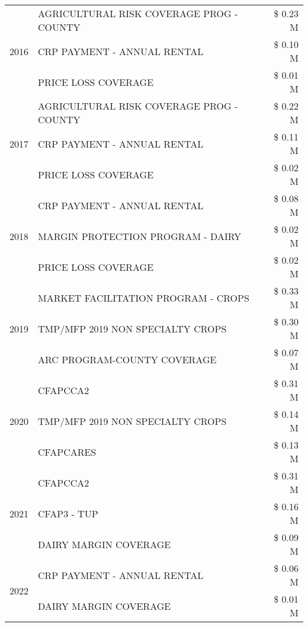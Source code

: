 \begin{tabular}{llr}
\cline{1-3}
\multirow[t]{3}{*}{2016} & AGRICULTURAL RISK COVERAGE PROG - COUNTY & \$ 0.23 M \\
 & CRP PAYMENT - ANNUAL RENTAL & \$ 0.10 M \\
 & PRICE LOSS COVERAGE & \$ 0.01 M \\
\cline{1-3}
\multirow[t]{3}{*}{2017} & AGRICULTURAL RISK COVERAGE PROG - COUNTY & \$ 0.22 M \\
 & CRP PAYMENT - ANNUAL RENTAL & \$ 0.11 M \\
 & PRICE LOSS COVERAGE & \$ 0.02 M \\
\cline{1-3}
\multirow[t]{3}{*}{2018} & CRP PAYMENT - ANNUAL RENTAL & \$ 0.08 M \\
 & MARGIN PROTECTION PROGRAM - DAIRY & \$ 0.02 M \\
 & PRICE LOSS COVERAGE & \$ 0.02 M \\
\cline{1-3}
\multirow[t]{3}{*}{2019} & MARKET FACILITATION PROGRAM - CROPS & \$ 0.33 M \\
 & TMP/MFP 2019 NON SPECIALTY CROPS & \$ 0.30 M \\
 & ARC PROGRAM-COUNTY COVERAGE & \$ 0.07 M \\
\cline{1-3}
\multirow[t]{3}{*}{2020} & CFAPCCA2 & \$ 0.31 M \\
 & TMP/MFP 2019 NON SPECIALTY CROPS & \$ 0.14 M \\
 & CFAPCARES & \$ 0.13 M \\
\cline{1-3}
\multirow[t]{3}{*}{2021} & CFAPCCA2 & \$ 0.31 M \\
 & CFAP3 - TUP & \$ 0.16 M \\
 & DAIRY MARGIN COVERAGE & \$ 0.09 M \\
\cline{1-3}
\multirow[t]{2}{*}{2022} & CRP PAYMENT - ANNUAL RENTAL & \$ 0.06 M \\
 & DAIRY MARGIN COVERAGE & \$ 0.01 M \\
\cline{1-3}
\bottomrule
\end{tabular}
